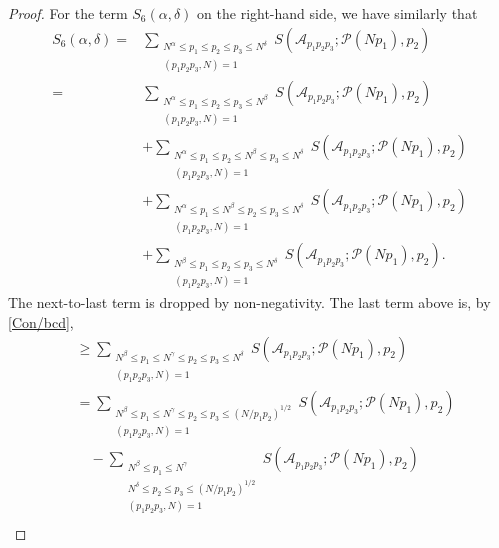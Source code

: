 \documentclass[12pt, a4paper]{amsart}
\def \N {{\mathbb N}}
\def\le{\leqslant}
\def\ge{\geqslant}
\theoremstyle{plain}
\theoremstyle{remark}
\numberwithin{equation}{section}
\begin{document}
\begin{proof}
For the term $S_6(\alpha, \delta)$ on the right-hand side, 
we have similarly that 
		\begin{equation}\label{GoldW10}
		\begin{split}
		S_6(\alpha, \delta) =& \sum_{\substack{N^\alpha \le p_1 \le p_2 \le p_3 \le N^{\delta} \\ (p_1 p_2 p_3, N) = 1}} S(\mathscr{A}_{p_1 p_2 p_3}; \mathscr{P}(N p_1), p_2)\\
		=&\sum_{\substack{N^\alpha \le p_1 \le p_2 \le p_3\le N^\beta \\ (p_1 p_2 p_3, N) = 1}}  S(\mathscr{A}_{p_1 p_2 p_3}; \mathscr{P}(Np_1), p_2)\\
		&+\sum_{\substack{N^\alpha \le p_1 \le p_2\le N^\beta \le p_3\le N^{\delta} \\ (p_1 p_2 p_3, N) = 1}}  S(\mathscr{A}_{p_1 p_2 p_3}; \mathscr{P}(Np_1), p_2)\\
		&+\sum_{\substack{N^\alpha \le p_1 \le N^\beta\le p_2\le p_3\le N^{\delta} \\ (p_1 p_2 p_3, N) = 1}}  S(\mathscr{A}_{p_1 p_2 p_3}; \mathscr{P}(Np_1), p_2)\\
		&+\sum_{\substack{N^\beta \le p_1 \le p_2\le p_3\le N^{\delta} \\ (p_1 p_2 p_3, N) = 1}}  S(\mathscr{A}_{p_1 p_2 p_3}; \mathscr{P}(Np_1), p_2). 
\end{split}
\end{equation}
The next-to-last term is dropped by non-negativity. The last term above is, by \eqref{Con/bcd}, 
\begin{equation}\label{GoldW11}
		\begin{split}
		& \ge \sum_{\substack{N^\beta \le p_1\le N^\gamma \le p_2\le p_3\le N^{\delta} \\ (p_1 p_2 p_3, N) = 1}}  S(\mathscr{A}_{p_1 p_2 p_3}; \mathscr{P}(Np_1), p_2)\\
		& = \sum_{\substack{N^\beta \le p_1\le N^\gamma \le p_2\le p_3\le (N/p_1p_2)^{1/2} \\ (p_1 p_2 p_3, N) = 1}}  S(\mathscr{A}_{p_1 p_2 p_3}; \mathscr{P}(Np_1), p_2)\\
		 &\quad  -\sum_{\substack{N^\beta \le p_1\le N^{\gamma}\\N^\delta \le p_2\le p_3\le (N/p_1p_2)^{1/2} \\ (p_1 p_2 p_3, N) = 1}}  S(\mathscr{A}_{p_1 p_2 p_3}; \mathscr{P}(Np_1), p_2)\\

\end{split}
\end{equation}
\end{proof}
\end{document}
